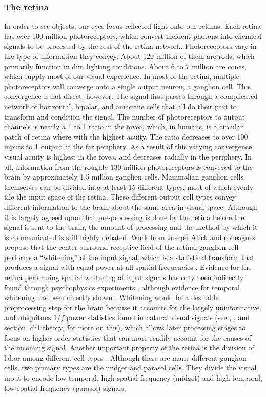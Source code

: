 \subsubsection{The retina}
In order to see objects, our eyes focus reflected light onto our retinas. Each retina has over 100 million photoreceptors, which convert incident photons into chemical signals to be processed by the rest of the retina network. Photoreceptors vary in the type of information they convey. About 120 million of them are rods, which primarily function in dim lighting conditions. About 6 to 7 million are cones, which supply most of our visual experience. In most of the retina, multiple photoreceptors will converge onto a single output neuron, a ganglion cell. This convergence is not direct, however. The signal first passes through a complicated network of horizontal, bipolar, and amacrine cells that all do their part to transform and condition the signal. The number of photoreceptors to output channels is nearly a 1 to 1 ratio in the fovea, which, in humans, is a circular patch of retina where with the highest acuity. The ratio decreases to over 100 inputs to 1 output at the far periphery. As a result of this varying convergence, visual acuity is highest in the fovea, and decreases radially in the periphery. In all, information from the roughly 130 million photoreceptors is conveyed to the brain by approximately 1.5 million ganglion cells. Mammalian ganglion cells themselves can be divided into at least 15 different types, most of which evenly tile the input space of the retina. These different output cell types convey different information to the brain about the same area in visual space. Although it is largely agreed upon that pre-processing is done by the retina before the signal is sent to the brain, the amount of processing and the method by which it is communicated is still highly debated. Work from Joseph Atick and colleagues propose that the center-surround receptive field of the retinal ganglion cell performs a ``whitening'' of the input signal, which is a statistical transform that produces a signal with equal power at all spatial frequencies \parencite{atick1990towards, atick1992what} . Evidence for the retina performing spatial whitening of input signals has only been indirectly found through psychophysics experiments \parencite{atick1992what}, although evidence for temporal whitening has been directly shown \parencite{dong1995statistics}. Whitening would be a desirable preprocessing step for the brain because it accounts for the largely uninformative and ubiquitous $1/f$ power statistics found in natural visual signals (see \parencite{field1999wavelets}, \parencite{field1989statistics}, and section \ref{ch1:theory} for more on this), which allows later processing stages to focus on higher order statistics that can more readily account for the causes of the incoming signal. Another important property of the retina is the division of labor among different cell types \parencite{van1995information}. Although there are many different ganglion cells, two primary types are the midget and parasol cells. They divide the visual input to encode low temporal, high spatial frequency (midget) and high temporal, low spatial frequency (parasol) signals. 